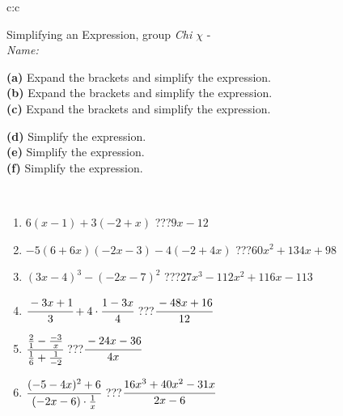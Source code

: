 \documentclass[10pt]{report}
\begin{document}
\newpage
\thispagestyle{empty}
\begin{tabular}{c:c}
\begin{minipage}[c][104.5mm][t]{0.5\linewidth}
\begin{center}
\vspace{7mm}
{\huge Simplifying an Expression, group \textit{Chi $\chi$} -}\\[5mm]
\textit{Name:}\phantom{xxxxxxxxxxxxxxxxxxxxxxxxxxxxxxxxxxxxxxxxxxxxxxxxxxxxxxxxxxxxxxxxx}\\[5mm]
\begin{minipage}{0.95\linewidth}
\begin{center}
{\small \begin{minipage}{0.6\textwidth}
\textbf{(a)} Expand the brackets and simplify the expression. \\[1mm]
\textbf{(b)} Expand the brackets and simplify the expression. \\[1mm]
\textbf{(c)} Expand the brackets and simplify the expression.
\end{minipage} \begin{minipage}{0.39\textwidth}
\textbf{(d)} Simplify the expression. \\[1mm]
\textbf{(e)} Simplify the expression. \\[1mm]
\textbf{(f)} Simplify the expression.
\end{minipage}
}
\end{center}
\end{minipage}
\\[4mm]
\begin{minipage}{0.79\linewidth}
\begin{center}
\begin{varwidth}{\linewidth}
\begin{enumerate}
\normalsize
\item $6(x-1)+3(-2+x)$\quad \dotfill\; ???\;\dotfill \quad $9x-12$
\item $-5(6+6x)(-2x-3)-4(-2+4x)$\quad \dotfill\; ???\;\dotfill \quad $60x^2+134x+98$
\item $(3x-4)^3-(-2x-7)^2$\quad \dotfill\; ???\;\dotfill \quad $27x^3-112x^2+116x-113$
\item $\cfrac{-3x+1}{3}+4\cdot\cfrac{1-3x}{4}$\quad \dotfill\; ???\;\dotfill \quad $\cfrac{-48x+16}{12}$
\item $\cfrac{\frac{2}{1}-\frac{-3}{x}}{\frac{1}{6}+\frac{1}{-2}}$\quad \dotfill\; ???\;\dotfill \quad $\cfrac{-24x-36}{4x}$
\item $\cfrac{(-5-4x)^2+6}{(-2x-6)\cdot\frac{1}{x}}$\quad \dotfill\; ???\;\dotfill \quad $\cfrac{16x^3+40x^2-31x}{2x-6}$

\end{enumerate}
\end{varwidth}
\end{center}
\end{minipage}
\end{center}
\end{minipage}
\end{tabular}
\end{document}
